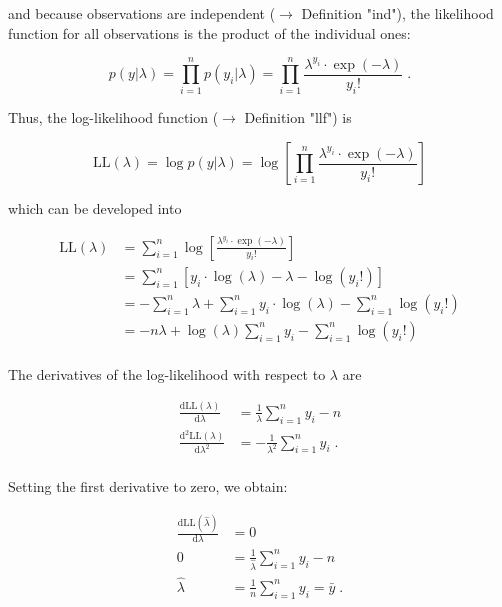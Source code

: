 \documentclass[a4paper,12pt]{book}
\begin{document}
and because observations are independent ($\rightarrow$ Definition "ind"), the likelihood function for all observations is the product of the individual ones:

\begin{equation} \label{eq:poiss-mle-Poiss-LF}
p(y|\lambda) = \prod_{i=1}^n p(y_i|\lambda) = \prod_{i=1}^n \frac{\lambda^{y_i} \cdot \exp(-\lambda)}{y_i !} \; .
\end{equation}

Thus, the log-likelihood function ($\rightarrow$ Definition "llf") is

\begin{equation} \label{eq:poiss-mle-Poiss-LL}
\mathrm{LL}(\lambda) = \log p(y|\lambda) = \log \left[ \prod_{i=1}^n \frac{\lambda^{y_i} \cdot \exp(-\lambda)}{y_i !} \right]
\end{equation}

which can be developed into

\begin{equation} \label{eq:poiss-mle-Poiss-LL-der}
\begin{split}
\mathrm{LL}(\lambda) &= \sum_{i=1}^n \log \left[ \frac{\lambda^{y_i} \cdot \exp(-\lambda)}{y_i !} \right] \\
&= \sum_{i=1}^n \left[ y_i \cdot \log(\lambda) - \lambda - \log(y_i !) \right] \\
&= - \sum_{i=1}^n \lambda + \sum_{i=1}^n y_i \cdot \log(\lambda) - \sum_{i=1}^n \log(y_i !) \\
&= - n \lambda + \log(\lambda) \sum_{i=1}^n y_i - \sum_{i=1}^n \log(y_i !) \\
\end{split}
\end{equation}

The derivatives of the log-likelihood with respect to $\lambda$ are

\begin{equation} \label{eq:poiss-mle-Poiss-dLLdl-d2LLdl2}
\begin{split}
\frac{\mathrm{d}\mathrm{LL}(\lambda)}{\mathrm{d}\lambda} &= \frac{1}{\lambda} \sum_{i=1}^n y_i - n \\
\frac{\mathrm{d}^2\mathrm{LL}(\lambda)}{\mathrm{d}\lambda^2} &= -\frac{1}{\lambda^2} \sum_{i=1}^n y_i \; . \\
\end{split}
\end{equation}

Setting the first derivative to zero, we obtain:

\begin{equation} \label{eq:poiss-mle-Poiss-dLLdl}
\begin{split}
\frac{\mathrm{d}\mathrm{LL}(\hat{\lambda})}{\mathrm{d}\lambda} &= 0 \\
0 &= \frac{1}{\hat{\lambda}} \sum_{i=1}^n y_i - n \\
\hat{\lambda} &= \frac{1}{n} \sum_{i=1}^n y_i = \bar{y} \; .
\end{split}
\end{equation}
\end{document}
